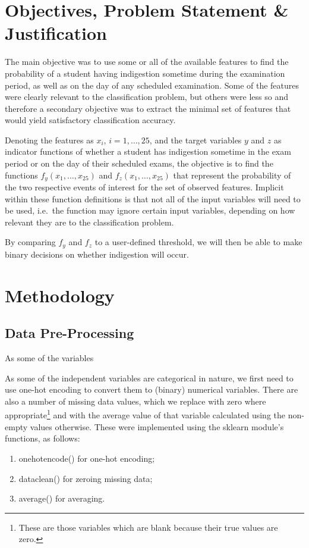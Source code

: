 \documentclass[12pt,a4paper]{article}
\begin{document}
	\section{Objectives, Problem Statement & Justification}\label{sec:prob}
	The main objective was to use some or all of the available features to find the probability of a student having indigestion sometime during the examination period, as well as on the day of any scheduled examination. Some of the features were clearly relevant to the classification problem, but others were less so and therefore a secondary objective was to extract the minimal set of features that would yield satisfactory classification accuracy.
	
	Denoting the features as $x_i$, $i = 1,\ldots,25$, and the target variables $y$ and $z$ as indicator functions of whether a student has indigestion sometime in the exam period or on the day of their scheduled exams, the objective is to find the functions $f_y(x_1,\ldots,x_{25})$ and $f_z(x_1,\ldots,x_{25})$ that represent the probability of the two respective events of interest for the set of observed features. Implicit within these function definitions is that not all of the input variables will need to be used, i.e.\ the function may ignore certain input variables, depending on how relevant they are to the classification problem.
	
	By comparing $f_y$ and $f_z$ to a user-defined threshold, we will then be able to make binary decisions on whether indigestion will occur.

	
	\section{Methodology}\label{sec:meth}
	\subsection{Data Pre-Processing}
	
	As some of the variables

	
	As some of the independent variables are categorical in nature, we first need to use one-hot encoding to convert them to (binary) numerical variables. There are also a number of missing data values, which we replace with zero where appropriate\footnote{These are those variables which are blank because their true values are zero.} and with the average value of that variable calculated using the non-empty values otherwise. These were implemented using the \textsf{sklearn} module's functions, as follows:
	\begin{enumerate}
		\item \textsf{onehotencode()} for one-hot encoding; 
		\item \textsf{dataclean()} for zeroing missing data;
		\item \textsf{average()} for averaging.
	\end{enumerate}
\end{document}
